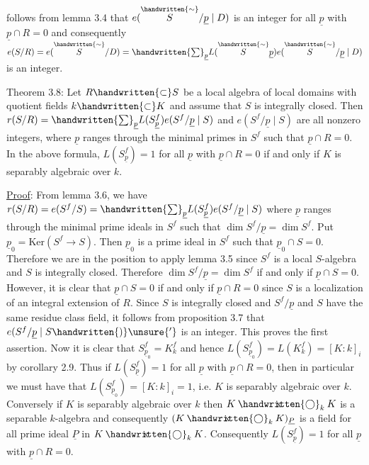 follows from lemma 3.4 that $e(\overset{\handwritten{\sim}}{S}/\underline p\mid D)$ is an integer for all $\underline p$ with $\underline p\cap R=0$ and consequently $e(S/R)=e(\overset{\handwritten{\sim}}{S}/D)=\handwritten{\sum}_{\underline p}L(\overset{\handwritten{\sim}}{S}\underline p)e(\overset{\handwritten{\sim}}{S}/\underline p\mid D)$ is an integer.

Theorem 3.8: Let $R\handwritten{\subset}S$ be a local algebra of local domains with quotient fields $k\handwritten{\subset}K$ and assume that $S$ is integrally closed. Then $r(S/R)=\handwritten{\sum}_{\underline p}L(S^f_{\underline p})e(S^f/\underline p\mid S)$ and $e(S^f/\underline p\mid S)$ are all nonzero integers, where $\underline p$ ranges through the minimal primes in $S^f$ such that $\underline p\cap R=0$. In the above formula, $L(S^f_{\underline p})=1$ for all $\underline p$ with $\underline p\cap R=0$ if and only if $K$ is separably algebraic over $k$.

\uline{Proof}: From lemma 3.6, we have $r(S/R)=e(S^f/S)=\handwritten{\sum}_{\underline p}L(S^f_{\underline p})e(S^f/\underline p\mid S)$ where $\underline p$ ranges through the minimal prime ideals in $S^f$ such that $\dim S^f/\underline p=\dim S^f$. Put $\underline p_0=\mathrm{Ker}(S^f\longrightarrow S)$. Then $\underline p_0$ is a prime ideal in $S^f$ such that $\underline p_0\cap S=0$. Therefore we are in the position to apply lemma 3.5 since $S^f$ is a local $S$-algebra and $S$ is integrally closed. Therefore $\dim S^f/\underline p=\dim S^f$ if and only if $\underline p\cap S=0$. However, it is clear that $\underline p\cap S=0$ if and only if $\underline p\cap R=0$ since $S$ is a localization of an integral extension of $R$. Since $S$ is integrally closed and $S^f/\underline p$ and $S$ have the same residue class field, it follows from proposition 3.7 that $e(S^f/\underline p\mid S\handwritten{)}\unsure{'}$ is an integer. This proves the first assertion. Now it is clear that $S^f_{\underline p_0}=K^f_k$ and hence $L(S^f_{\underline p_0})=L(K^f_k)=[K:k]_i$ by corollary 2.9. Thus if $L(S^f_{\underline p})=1$ for all $\underline p$ with $\underline p\cap R=0$, then in particular we must have that $L(S^f_{\underline p_0})=[K:k]_i=1$, i.e. $K$ is separably algebraic over $k$. Conversely if $K$ is separably algebraic over $k$ then $K\mathbin{\ooalign{\hfil$\mathrm{x}$\hfil\cr\hfil$\handwritten{\bigcirc}$\hfil\cr}}_k K$ is a separable $k$-algebra and consequently $(K\mathbin{\ooalign{\hfil$\mathrm{x}$\hfil\cr\hfil$\handwritten{\bigcirc}$\hfil\cr}}_k K)_{\underline P}$ is a field for all prime ideal $\underline P$ in $K\mathbin{\ooalign{\hfil$\mathrm{x}$\hfil\cr\hfil$\handwritten{\bigcirc}$\hfil\cr}}_k K$. Consequently $L(S^f_{\underline p})=1$ for all $\underline p$ with $\underline p\cap R=0$.
